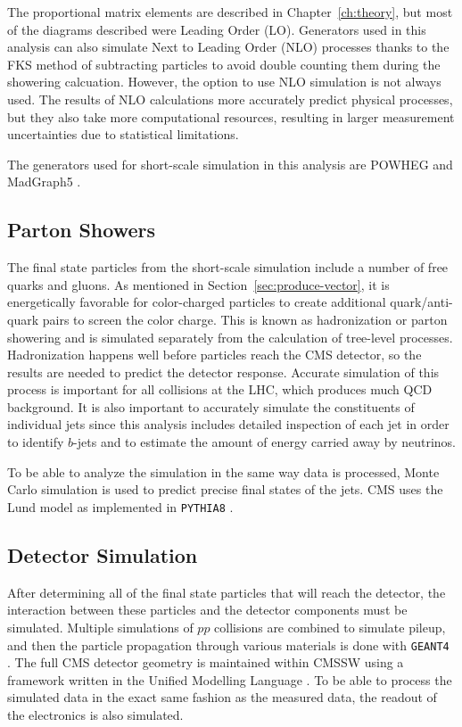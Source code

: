 The proportional matrix elements are described in Chapter~\ref{ch:theory},
but most of the diagrams described were Leading Order (LO).
Generators used in this analysis can also simulate Next to Leading Order (NLO) processes
thanks to the FKS method of subtracting particles to avoid double counting them during the
showering calcuation.
However, the option to use NLO simulation is not always used.
The results of NLO calculations more accurately predict physical processes,
but they also take more computational resources,
resulting in larger measurement uncertainties due to statistical limitations.

The generators used for short-scale simulation in this analysis
are POWHEG \cite{Oleari_2010} and MadGraph5 \cite{hirschi2015automated}.

\subsection{Parton Showers}

The final state particles from the short-scale simulation
include a number of free quarks and gluons.
As mentioned in Section~\ref{sec:produce-vector},
it is energetically favorable for color-charged particles to create additional
quark/anti-quark pairs to screen the color charge.
This is known as hadronization or parton showering and
is simulated separately from the calculation of tree-level processes.
Hadronization happens well before particles reach the CMS detector,
so the results are needed to predict the detector response.
Accurate simulation of this process is important for all collisions at the LHC,
which produces much QCD background.
It is also important to accurately simulate the constituents of individual jets
since this analysis includes detailed inspection of each jet
in order to identify $b$-jets and to estimate the amount of energy carried away by neutrinos.

To be able to analyze the simulation in the same way data is processed,
Monte Carlo simulation is used to predict precise final states of the jets.
CMS uses the Lund model \cite{ANDERSSON198331} as implemented in
\texttt{PYTHIA8} \cite{SJOSTRAND2015159}.

\subsection{Detector Simulation}

After determining all of the final state particles that will reach the detector,
the interaction between these particles and the detector components must be simulated.
Multiple simulations of $pp$ collisions are combined to simulate pileup,
and then the particle propagation through various materials is done with
\texttt{GEANT4} \cite{AGOSTINELLI2003250}.
The full CMS detector geometry is maintained within CMSSW \cite{Hildreth_2015}
using a framework written in the Unified Modelling Language \cite{Lefebure:687188}.
To be able to process the simulated data in the exact same fashion as the measured data,
the readout of the electronics is also simulated.

